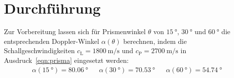 \section{Durchführung}
\label{sec:durchführung}

Zur Vorbereitung lassen sich für Prismenwinkel $\theta$ von $\qty{15}{\degree}$, $\qty{30}{\degree}$ und $\qty{60}{\degree}$ die
entsprechenden Doppler-Winkel $\alpha (\theta)$ berechnen, indem die Schallgeschwindigkeiten $c_\text{L} = \qty{1800}{\meter\per\second}$
und $c_\text{P} = \qty{2700}{\meter\per\second}$ in Ausdruck~\eqref{eqn:prisma} eingesetzt werden:
\begin{align*}
\alpha (\qty{15}{\degree}) = \qty{80.06}{\degree} &&
\alpha (\qty{30}{\degree}) = \qty{70.53}{\degree} &&
\alpha (\qty{60}{\degree}) = \qty{54.74}{\degree}
\end{align*}

